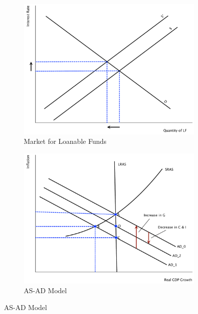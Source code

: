 \documentclass[11pt]{article}\usepackage[]{graphicx}\usepackage[]{color}
\theoremstyle{definition}
\begin{document}
\begin{enumerate}
		\begin{figure}[H]
			\centering
			\caption{Crowding Out}
			\begin{subfigure}{.5\textwidth}
				\includegraphics[scale=.40]{plot92.pdf}
				\caption{Market for Loanable Funds}
			\end{subfigure}%
			\begin{subfigure}{.5\textwidth}
				\centering
				\includegraphics[scale=.40]{plot106.pdf}
				\caption{AS-AD Model}
			\end{subfigure}
		\end{figure}
		
\end{enumerate}
\end{document}
